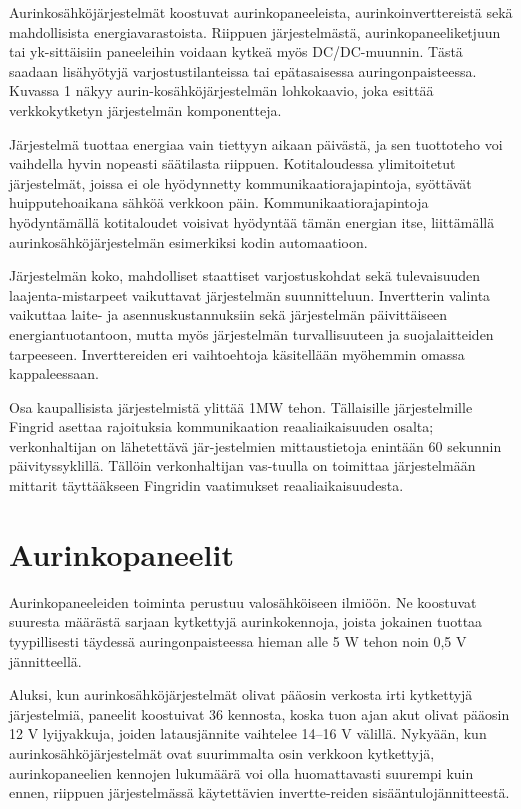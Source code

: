 Aurinkosähköjärjestelmät koostuvat aurinkopaneeleista, aurinkoinverttereistä sekä mahdollisista energiavarastoista. Riippuen järjestelmästä, aurinkopaneeliketjuun tai yk-sittäisiin paneeleihin voidaan kytkeä myös DC/DC-muunnin. Tästä saadaan lisähyötyjä varjostustilanteissa tai epätasaisessa auringonpaisteessa.  Kuvassa 1 näkyy aurin-kosähköjärjestelmän lohkokaavio, joka esittää verkkokytketyn järjestelmän komponentteja. 

Järjestelmä tuottaa energiaa vain tiettyyn aikaan päivästä, ja sen tuottoteho voi vaihdella hyvin nopeasti säätilasta riippuen. Kotitaloudessa ylimitoitetut järjestelmät, joissa ei ole hyödynnetty kommunikaatiorajapintoja, syöttävät huipputehoaikana sähköä verkkoon päin. Kommunikaatiorajapintoja hyödyntämällä kotitaloudet voisivat hyödyntää tämän energian itse, liittämällä aurinkosähköjärjestelmän esimerkiksi kodin automaatioon.

Järjestelmän koko, mahdolliset staattiset varjostuskohdat sekä tulevaisuuden laajenta-mistarpeet vaikuttavat järjestelmän suunnitteluun. Invertterin valinta vaikuttaa laite- ja asennuskustannuksiin sekä järjestelmän päivittäiseen energiantuotantoon, mutta myös järjestelmän turvallisuuteen ja suojalaitteiden tarpeeseen. Inverttereiden eri vaihtoehtoja käsitellään myöhemmin omassa kappaleessaan.

Osa kaupallisista järjestelmistä ylittää 1MW tehon. Tällaisille järjestelmille Fingrid asettaa rajoituksia kommunikaation reaaliaikaisuuden osalta; verkonhaltijan on lähetettävä jär-jestelmien mittaustietoja enintään 60 sekunnin päivityssyklillä. Tällöin verkonhaltijan vas-tuulla on toimittaa järjestelmään mittarit täyttääkseen Fingridin vaatimukset reaaliaikaisuudesta.  

\section{Aurinkopaneelit}
  Aurinkopaneeleiden toiminta perustuu valosähköiseen ilmiöön. Ne koostuvat suuresta määrästä sarjaan kytkettyjä aurinkokennoja, joista jokainen tuottaa tyypillisesti täydessä auringonpaisteessa hieman alle 5 W tehon noin 0,5 V jännitteellä. 

  Aluksi, kun aurinkosähköjärjestelmät olivat pääosin verkosta irti kytkettyjä järjestelmiä, paneelit koostuivat 36 kennosta, koska tuon ajan akut olivat pääosin 12 V lyijyakkuja, joiden latausjännite vaihtelee 14–16 V välillä. Nykyään, kun aurinkosähköjärjestelmät ovat suurimmalta osin verkkoon kytkettyjä, aurinkopaneelien kennojen lukumäärä voi olla huomattavasti suurempi kuin ennen, riippuen järjestelmässä käytettävien invertte-reiden sisääntulojännitteestä. 

